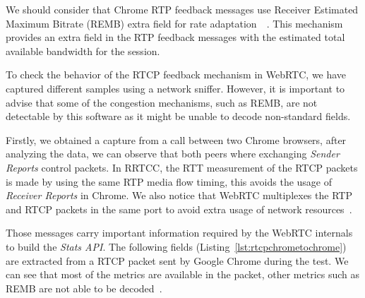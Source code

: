 
We should consider that Chrome RTP feedback messages use Receiver Estimated Maximum Bitrate (REMB)  extra field for rate adaptation~\cite{alvestrandCongestion2012}~\cite{alvestrandCongestionREMB}. This mechanism provides an extra field in the RTP feedback messages with the estimated total available bandwidth for the session. 



To check the behavior of the RTCP feedback mechanism in WebRTC, we have captured different samples using a network sniffer. However, it is important to advise that some of the congestion mechanisms, such as REMB, are not detectable by this software as it might be unable to decode non-standard fields.


Firstly, we obtained a capture from a call between two Chrome browsers, after analyzing the data, we can observe that both peers where exchanging {\it Sender Reports} control packets. In RRTCC, the RTT measurement of the RTCP packets is made by using the same RTP media flow timing, this avoids the usage of {\it Receiver Reports} in Chrome. We also notice that WebRTC multiplexes the RTP and RTCP packets in the same port to avoid extra usage of network resources~\cite{rtpusageIETF}.

Those messages carry important information required by the WebRTC internals to build the {\it Stats API}. The following fields (Listing~\ref{lst:rtcpchrometochrome}) are extracted from a RTCP packet sent by Google Chrome during the test. We can see that most of the metrics are available in the packet, other metrics such as REMB are not able to be decoded~\cite{rtpusageIETF}.

